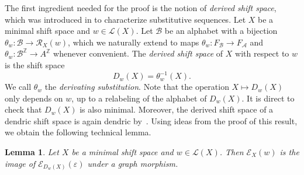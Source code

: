 \documentclass{amsart}
\newcommand*{\Z}{\mathbb{Z}}
\newcommand*{\ret}{\mathcal{R}}
\newcommand*{\lang}{\mathcal{L}}
\newcommand*{\cA}{\mathcal{A}}
\newcommand*{\cB}{\mathcal{B}}
\newcommand*{\from}{\colon}
\newcommand*{\ExtGraph}{\mathcal{E}}
\theoremstyle{plain}
\newtheorem{lemma}[theorem]{Lemma}
\theoremstyle{definition}
\theoremstyle{remark}
\begin{document}
The first ingredient needed for the proof is the notion of \emph{derived shift space}, which was introduced in \cite{Durand1998} to characterize substitutive sequences. Let $X$ be a minimal shift space and $w\in\lang(X)$. Let $\cB$ be an alphabet with a bijection $\theta_w\from\cB\to \ret_X(w)$, which we naturally extend to maps $\theta_w\from F_\cB \to F_\cA$ and $\theta_w\from\cB^\Z\to A^\Z$ whenever convenient. The \emph{derived shift space} of $X$ with respect to $w$ is the shift space
\begin{equation*}
    D_w(X) = \theta_w^{-1}(X).
\end{equation*}
We call $\theta_w$ the \emph{derivating substitution}. Note that the operation $X\mapsto D_w(X)$ only depends on $w$, up to a relabeling of the alphabet of $D_w(X)$. It is direct to check that $D_w(X)$ is also minimal. Moreover, the derived shift space of a dendric shift space is again dendric by~\cite[Theorem 5.13]{Berthe2015a}. Using ideas from the proof of this result, we obtain the following technical lemma.

\begin{lemma}\label{L:isomorphism generalized extension graph}
    Let $X$ be a minimal shift space and $w \in \lang(X)$. Then $\ExtGraph_X(w)$ is the image of $\ExtGraph_{D_w(X)}(\varepsilon)$ under a graph morphism.
\end{lemma}
\end{document}
